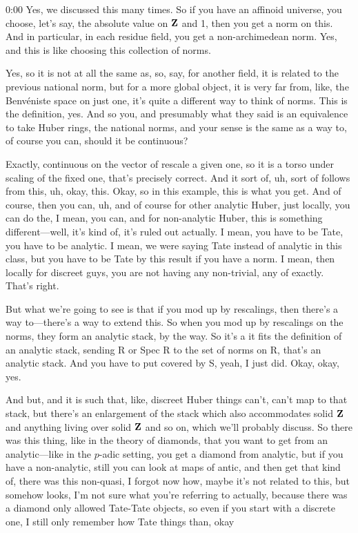 \begin{unfinished}{0:00}
Yes, we discussed this many times. So if you have an affinoid universe, you choose, let's say, the absolute value on $\mathbf Z$ and 1, then you get a norm on this. And in particular, in each residue field, you get a non-archimedean norm. Yes, and this is like choosing this collection of norms.

Yes, so it is not at all the same as, so, say, for another field, it is related to the previous national norm, but for a more global object, it is very far from, like, the Benvéniste space on just one, it's quite a different way to think of norms. This is the definition, yes. And so you, and presumably what they said is an equivalence to take Huber rings, the national norms, and your sense is the same as a way to, of course you can, should it be continuous? 

Exactly, continuous on the vector of rescale a given one, so it is a torso under scaling of the fixed one, that's precisely correct. And it sort of, uh, sort of follows from this, uh, okay, this. Okay, so in this example, this is what you get. And of course, then you can, uh, and of course for other analytic Huber, just locally, you can do the, I mean, you can, and for non-analytic Huber, this is something different---well, it's kind of, it's ruled out actually. I mean, you have to be Tate, you have to be analytic. I mean, we were saying Tate instead of analytic in this class, but you have to be Tate by this result if you have a norm. I mean, then locally for discreet guys, you are not having any non-trivial, any of exactly. That's right.

But what we're going to see is that if you mod up by rescalings, then there's a way to---there's a way to extend this. So when you mod up by rescalings on the norms, they form an analytic stack, by the way. So it's a it fits the definition of an analytic stack, sending R or Spec R to the set of norms on R, that's an analytic stack. And you have to put covered by S, yeah, I just did. Okay, okay, yes.

And but, and it is such that, like, discreet Huber things can't, can't map to that stack, but there's an enlargement of the stack which also accommodates solid $\mathbf Z$ and anything living over solid $\mathbf Z$ and so on, which we'll probably discuss. So there was this thing, like in the theory of diamonds, that you want to get from an analytic---like in the $p$-adic setting, you get a diamond from analytic, but if you have a non-analytic, still you can look at maps of antic, and then get that kind of, there was this non-quasi, I forgot now how, maybe it's not related to this, but somehow looks, I'm not sure what you're referring to actually, because there was a diamond only allowed Tate-Tate objects, so even if you start with a discrete one, I still only remember how Tate things than, okay

\end{unfinished}